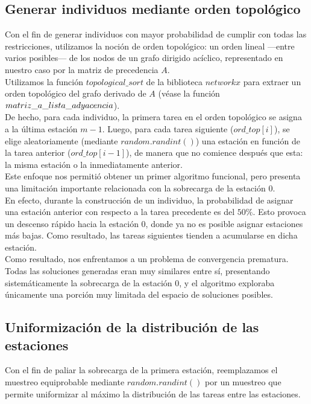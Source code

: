 \documentclass[12pt]{report}
\begin{document}
\subsection*{Generar individuos mediante orden topológico}

Con el fin de generar individuos con mayor probabilidad de cumplir con todas las restricciones, utilizamos la noción de orden topológico: un orden lineal —entre varios posibles— de los nodos de un grafo dirigido acíclico, representado en nuestro caso por la matriz de precedencia $A$. \\
Utilizamos la función $topological\_sort$ de la biblioteca $networkx$ para extraer un orden topológico del grafo derivado de $A$ (véase la función $matriz\_a\_ \\ lista\_adyacencia$).\\

De hecho, para cada individuo, la primera tarea en el orden topológico se asigna a la última estación $m-1$. Luego, para cada tarea siguiente ($ord\_top[i]$), se elige aleatoriamente (mediante $random.randint()$) una estación en función de la tarea anterior ($ord\_top[i-1]$), de manera que no comience después que esta: la misma estación o la inmediatamente anterior. \\

Este enfoque nos permitió obtener un primer algoritmo funcional, pero presenta una limitación importante relacionada con la sobrecarga de la estación $0$. \\
En efecto, durante la construcción de un individuo, la probabilidad de asignar una estación anterior con respecto a la tarea precedente es del $50\%$. Esto provoca un descenso rápido hacia la estación $0$, donde ya no es posible asignar estaciones más bajas. Como resultado, las tareas siguientes tienden a acumularse en dicha estación.\\

Como resultado, nos enfrentamos a un problema de convergencia prematura. Todas las soluciones generadas eran muy similares entre sí, presentando sistemáticamente la sobrecarga de la estación $0$, y el algoritmo exploraba únicamente una porción muy limitada del espacio de soluciones posibles.


\subsection*{Uniformización de la distribución de las estaciones}

Con el fin de paliar la sobrecarga de la primera estación, reemplazamos el muestreo equiprobable mediante $random.randint()$ por un muestreo que permite uniformizar al máximo la distribución de las tareas entre las estaciones.\\
\end{document}
